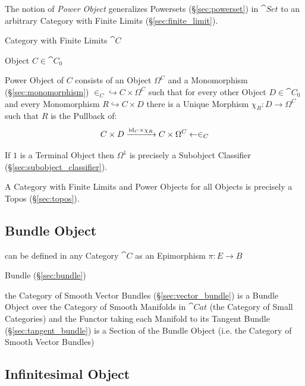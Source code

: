 The notion of \emph{Power Object} generalizes Powersets
(\S\ref{sec:powerset}) in $\cat{Set}$ to an arbitrary Category with
Finite Limits (\S\ref{sec:finite_limit}).

Category with Finite Limits $\cat{C}$

Object $C \in \cat{C}_0$

Power Object of $C$ consists of an Object $\Omega^C$ and a Monomorphism
(\S\ref{sec:monomorphism}) $\in_C \hookrightarrow C \times \Omega^C$ such that
for every other Object $D \in \cat{C}_0$ and every Monomorphism $R
\hookrightarrow C \times D$ there is a Unique Morphism $\chi_R : D \rightarrow
\Omega^C$ such that $R$ is the Pullback of:
\[
  C \times D \xrightarrow{\mathrm{id}_C \times \chi_R} C \times \Omega^C
    \leftarrow \in_C
\]

If $1$ is a Terminal Object then $\Omega^1$ is precisely a Subobject Classifier
(\S\ref{sec:subobject_classifier}).

A Category with Finite Limits and Power Objects for all Objects is precisely a
Topos (\S\ref{sec:topos}).



\subsection{Bundle Object}\label{sec:bundle_object}

can be defined in any Category $\cat{C}$ as an Epimorphism $\pi : E \rightarrow
B$

Bundle (\S\ref{sec:bundle})

the Category of Smooth Vector Bundles (\S\ref{sec:vector_bundle}) is a Bundle
Object over the Category of Smooth Manifolds in $\cat{Cat}$ (the Category of
Small Categories) and the Functor taking each Manifold to its Tangent Bundle
(\S\ref{sec:tangent_bundle}) is a Section of the Bundle Object (i.e. the
Category of Smooth Vector Bundles)



\subsection{Infinitesimal Object}\label{sec:infinitesimal_object}

